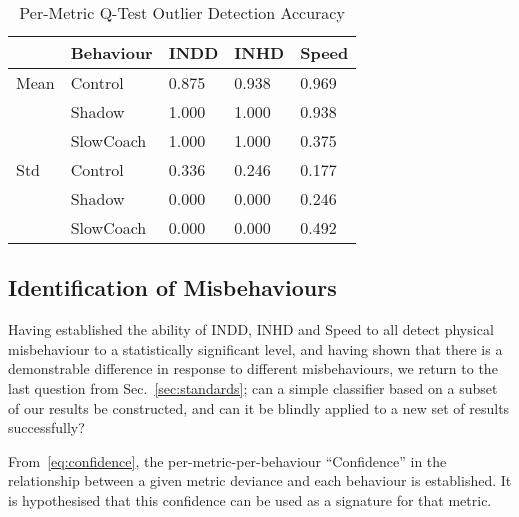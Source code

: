 \begin{table}
  \caption{Per-Metric Q-Test Outlier Detection Accuracy}
  \centering
\begin{tabular}{lllll}
\toprule
{} & Behaviour &  INDD &  INHD & Speed \\
\midrule
Mean & Control & 0.875 & 0.938 & 0.969 \\
     & Shadow & 1.000 & 1.000 & 0.938 \\
     & SlowCoach & 1.000 & 1.000 & 0.375 \\
Std & Control & 0.336 & 0.246 & 0.177 \\
     & Shadow & 0.000 & 0.000 & 0.246 \\
     & SlowCoach & 0.000 & 0.000 & 0.492 \\
\bottomrule
\end{tabular}
  \label{tab:per_metric_stats}
\end{table}

\subsection{Identification of Misbehaviours}
Having established the ability of INDD, INHD and Speed to all detect physical misbehaviour to a statistically significant level, and having shown that there is a demonstrable difference in response to different misbehaviours, we return to the last question from Sec.~\ref{sec:standards}; can a simple classifier based on a subset of our results be constructed, and can it be blindly applied to a new set of results successfully?

From~\eqref{eq:confidence}, the per-metric-per-behaviour ``Confidence'' in the relationship between a given metric deviance and each behaviour is established. It is hypothesised that this confidence can be used as a signature for that metric.

